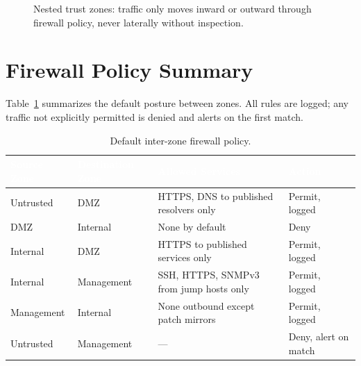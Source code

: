 \documentclass[11pt,a4paper]{report}
\newcommand{\thd}[1]{\textcolor{white}{\textbf{#1}}}
\begin{document}
\begin{figure}[H]
\centering
{}
\caption{Nested trust zones: traffic only moves inward or outward through firewall policy, never laterally without inspection.}
\label{fig:zones}
\end{figure}

\section{Firewall Policy Summary}
Table~\ref{tab:policy} summarizes the default posture between zones. All rules are logged;
any traffic not explicitly permitted is denied and alerts on the first match.

\begin{table}[H]
\centering
{}
\begin{tabularx}{\linewidth}{@{}l l X l@{}}
\toprule
\rowcolor{navy}
\thd{Source Zone} & \thd{Destination Zone} & \thd{Allowed Services} & \thd{Action} \\
\midrule
Untrusted   & DMZ          & HTTPS, DNS to published resolvers only & Permit, logged \\
DMZ         & Internal     & None by default & Deny \\
Internal    & DMZ          & HTTPS to published services only & Permit, logged \\
Internal    & Management   & SSH, HTTPS, SNMPv3 from jump hosts only & Permit, logged \\
Management  & Internal     & None outbound except patch mirrors & Permit, logged \\
Untrusted   & Management   & --- & Deny, alert on match \\
\bottomrule
\end{tabularx}
\caption{Default inter-zone firewall policy.}
\label{tab:policy}
\end{table}
\end{document}

